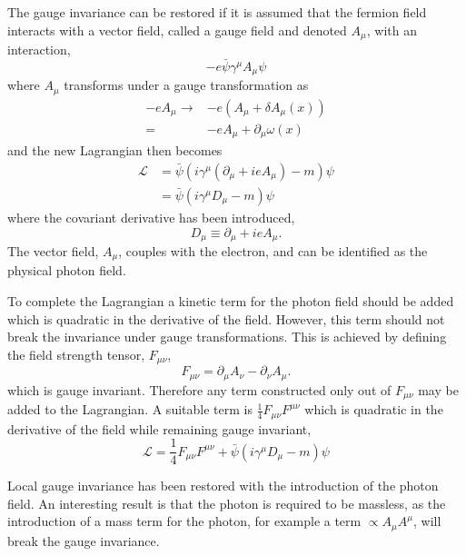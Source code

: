 The gauge invariance can be restored if it is assumed that the fermion field
interacts with a vector field, called a gauge field and denoted $A_{\mu}$, with
an interaction,
\begin{equation}
-e\bar{\psi}\gamma^{\mu}A_{\mu}\psi
\end{equation}
where $A_\mu$ transforms under a gauge transformation as 
\begin{align}
-eA_{\mu} \to & -e\left(A_{\mu}+\delta A_{\mu}(x)\right)\\
           =   & -e A_{\mu} + \partial_{\mu} \omega (x)
\end{align}
and the new Lagrangian then becomes
\begin{align}
\mathcal{L} 
&= \bar{\psi}( i\gamma^{\mu} ( \partial_{\mu} +i e A_{\mu}) - m)\psi \\
&= \bar{\psi}( i\gamma^{\mu} D_{\mu} - m)\psi 
\end{align}
where the covariant derivative has been introduced,
\begin{equation}
D_{\mu} \equiv \partial_{\mu} + i e A_{\mu}.
\label{eq:covar_deriv}
\end{equation}
The vector field, $A_{\mu}$, couples with the electron, and can be identified as
the physical photon field. 

To complete the Lagrangian a kinetic term for the photon field should be added
which is quadratic in the derivative of the field.
However, this term should not break the invariance under gauge transformations.
This is achieved by defining the field strength tensor, $F_{\mu\nu}$,
\begin{equation}
F_{\mu\nu}
= \partial_{\mu} A_{\nu} - \partial_{\nu} A_{\mu}.
\label{eq:fieldstrengthtensor}
\end{equation}
which is gauge invariant. Therefore any term constructed only out of 
 $F_{\mu\nu}$ may be added to the Lagrangian.
A suitable term is $\frac{1}{4} F_{\mu\nu} F^{\mu\nu}$ which is quadratic in the
derivative of the field while remaining gauge invariant,
\begin{equation}
\mathcal{L} = \frac{1}{4} F_{\mu\nu} F^{\mu\nu} + \bar{\psi}( i\gamma^{\mu} D_{\mu} - m)\psi 
\end{equation}

Local gauge invariance has been restored with the introduction of the photon
field. An interesting result is that the photon is required to be massless, as
the introduction of a mass term for the photon, for example a term $\propto
A_{\mu}A^{\mu}$, will break the gauge invariance.

